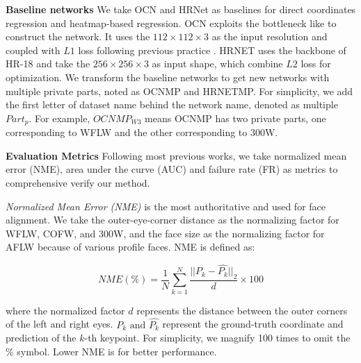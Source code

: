 \documentclass[journal,transmag]{IEEEtran}
\begin{document}

{\bf Baseline networks} We take OCN and HRNet as baselines for direct coordinates regression and heatmap-based regression.
OCN exploits the bottleneck \cite{sandler2018mobilenetv2} like \cite{guo2019pfld} to construct the network.
It uses the  $112 \times 112 \times 3$ as the input resolution and coupled with $L1$ loss following previous practice \cite{feng2018wing,guo2019pfld}.
HRNET uses the backbone of HR-18\cite{HRNET} and take the $256 \times 256 \times 3 $ as input shape, which combine $L2$ loss for optimization.
We transform the baseline networks to get new networks with multiple private parts, noted as OCNMP and HRNETMP.
For simplicity, we add the first letter of dataset name behind the network name, denoted as multiple $Part_p$.
For example, $OCNMP_{W3}$ means OCNMP has two private parts, one corresponding to WFLW\cite{LABWFLW} and the other corresponding to 300W\cite{300W}.



{\bf Evaluation Metrics} Following most previous works\cite{HRNET,kumar2018disentangling,LABWFLW,dong2018style}, 
we take normalized mean error (NME), area under the curve (AUC) and failure rate (FR) as metrics to comprehensive verify our method.

\emph{Normalized Mean Error (NME)} is the most authoritative and used for face alignment.
We take the outer-eye-corner distance as the normalizing factor for WFLW\cite{LABWFLW}, COFW\cite{COFW}, and 300W\cite{300W}, 
and the face size as the normalizing factor for AFLW because of various profile faces\cite{AFLW}. 
NME is defined as:

\begin{equation}
   NME(\%) = \frac{1}{N} \sum_{k = 1}^{N} \frac{||P_k-\hat{P_k}||_2}{d} \times  100
\end{equation}

where the normalized factor $d$ represents the distance between the outer corners of the left and right eyes. 
$P_k \text{ and } \hat{P_k}$ represent the ground-truth coordinate and prediction of the $k$-th keypoint.
For simplicity, we magnify 100 times to omit the \% symbol. 
Lower NME is for better performance.
\end{document}
